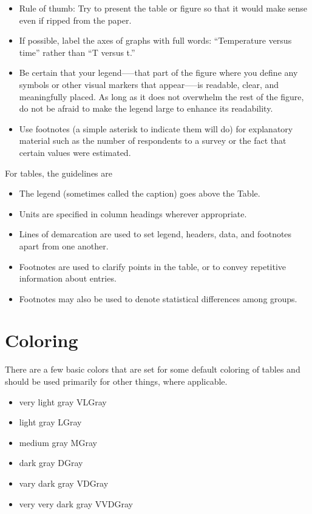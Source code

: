 \begin{itemize}
    \item Rule of thumb: Try to present the table or figure so that it would make sense even if ripped from the paper.
    \item If possible, label the axes of graphs with full words: ``Temperature versus time'' rather than ``T versus t.''
    \item Be certain that your legend—--that part of the figure where you define any symbols or other visual markers that appear—--is readable, clear, and meaningfully placed. As long as it does not overwhelm the rest of the figure, do not be afraid to make the legend large to enhance its readability.
    \item Use footnotes (a simple asterisk to indicate them will do) for explanatory material such as the number of respondents to a survey or the fact that certain values were estimated.
\end{itemize}

For tables, the guidelines are

\begin{itemize}
    \item The legend (sometimes called the caption) goes above the Table.
    \item Units are specified in column headings wherever appropriate.
    \item Lines of demarcation are used to set legend, headers, data, and footnotes apart from one another.
    \item Footnotes are used to clarify points in the table, or to convey repetitive information about entries.
    \item Footnotes may also be used to denote statistical differences among groups.
\end{itemize}


\section{Coloring}

There are a few basic colors that are set for some default coloring of tables and should be used primarily for other things, where applicable.

\begin{itemize}
    \item very light gray \textcolor{VLGray}{VLGray}
    \item light gray \textcolor{LGray}{LGray}
    \item medium gray \textcolor{MGray}{MGray}
    \item dark gray \textcolor{DGray}{DGray}
    \item vary dark gray \textcolor{VDGray}{VDGray}
    \item very very dark gray \textcolor{VVDGray}{VVDGray}
\end{itemize}


